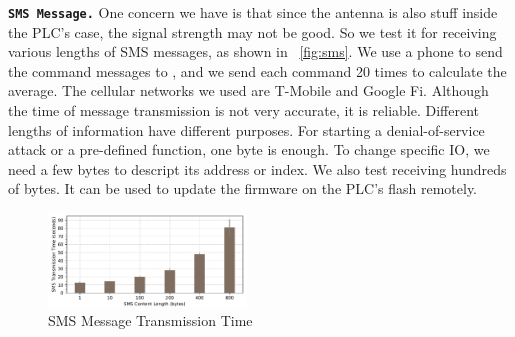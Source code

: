 %


\texttt{\textbf{SMS Message.}} One concern we have is that since the antenna is also stuff inside the PLC's case, the signal strength may not be good. So we test it for receiving various lengths of SMS messages, as shown in ~\autoref{fig:sms}. We use a phone to send the command messages to \name, and we send each command 20 times to calculate the average. The cellular networks we used are T-Mobile and Google Fi. Although the time of message transmission is not very accurate, it is reliable. Different lengths of information have different purposes. For starting a denial-of-service attack or a pre-defined function, one byte is enough. To change specific IO, we need a few bytes to descript its address or index. We also test receiving hundreds of bytes. It can be used to update the firmware on the PLC's flash remotely.

\begin{figure}[th]
	\includegraphics[width=0.47\textwidth]{figures/smstime}
	\centering
	\caption{SMS Message Transmission Time}
	\label{fig:smstime}
\end{figure}

